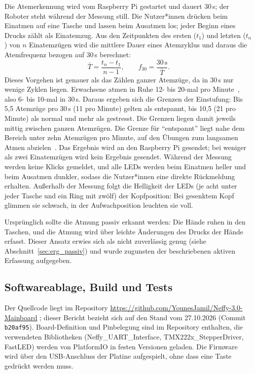 Die Atemerkennung wird vom Raspberry Pi gestartet und dauert 30\,s; der Roboter steht während der
Messung still. Die Nutzer*innen drücken
beim Einatmen auf eine Tasche und lassen beim Ausatmen los; jeder Beginn eines Drucks zählt als
Einatemzug. Aus den Zeitpunkten des ersten ($t_1$) und letzten ($t_n$) von $n$ Einatemzügen
wird die mittlere Dauer eines Atemzyklus und daraus die Atemfrequenz bezogen auf 30\,s
berechnet:
\begin{equation}
  \bar{T} = \frac{t_n - t_1}{n - 1}, \qquad
  f_{30} = \frac{30\,\mathrm{s}}{\bar{T}}.
  \label{eq:atemfrequenz}
\end{equation}
Dieses Vorgehen ist genauer als das Zählen ganzer Atemzüge, da in 30\,s nur wenige Zyklen
liegen. Erwachsene atmen in Ruhe 12- bis 20-mal pro Minute~\cite{nicolo2020rr}, also 6- bis
10-mal in 30\,s. Daraus ergeben sich die Grenzen der Einstufung: Bis 5{,}5 Atemzüge pro 30\,s
(11 pro Minute) gelten als entspannt, bis 10{,}5 (21 pro Minute) als normal und mehr als
gestresst. Die Grenzen liegen damit jeweils mittig zwischen ganzen Atemzügen. Die Grenze für
\enquote{entspannt} liegt nahe dem Bereich unter zehn Atemzügen pro Minute, auf den Übungen zum
langsamen Atmen abzielen~\cite{zaccaro2018slow}. Das Ergebnis wird an den
Raspberry Pi gesendet; bei weniger als zwei Einatemzügen wird kein Ergebnis gesendet.
Während der Messung werden keine Klicks gemeldet, und alle \acp{LED} werden beim Einatmen
heller und beim Ausatmen dunkler, sodass die Nutzer*innen eine direkte Rückmeldung erhalten.
Außerhalb der Messung folgt die Helligkeit der \acp{LED} (je acht unter jeder Tasche und ein Ring
mit zwölf) der Kopfposition: Bei gesenktem Kopf glimmen sie schwach, in der Aufwachposition
leuchten sie voll.

Ursprünglich sollte die Atmung passiv erkannt werden: Die Hände ruhen in den Taschen, und die
Atmung wird über leichte Änderungen des Drucks der Hände erfasst. Dieser Ansatz erwies sich
als nicht zuverlässig genug (siehe Abschnitt~\ref{sec:erg_passiv}) und wurde zugunsten der
beschriebenen aktiven Erfassung aufgegeben.

\subsection{Softwareablage, Build und Tests}
\label{sec:sw_ablage}

Der Quellcode liegt im Repository \url{https://github.com/YounesJamil/Neffy-3.0-Mainboard}
\cite{jamil2026mainboard}; dieser Bericht bezieht sich auf den Stand vom 27.10.2026
(Commit \texttt{b20af95}). Board-Definition und Pinbelegung sind im Repository enthalten,
die verwendeten Bibliotheken (Neffy\_UART\_Interface, TMX222x\_StepperDriver, FastLED)
werden von PlatformIO in festen Versionen geladen. Die Firmware wird über den USB-Anschluss
der Platine aufgespielt, ohne dass eine Taste gedrückt werden muss.

